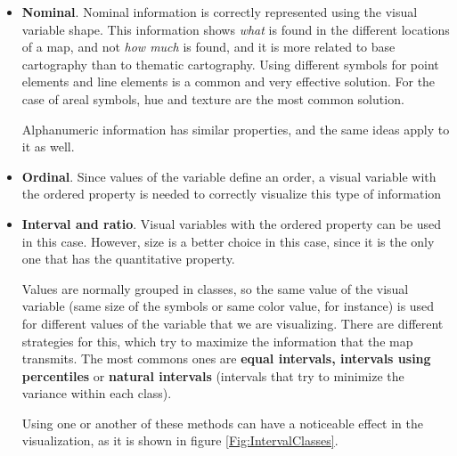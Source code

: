 \begin{itemize}
	
	\item \textbf{Nominal}. Nominal information is correctly represented using the visual variable shape. This information shows \emph{what} is found in the different locations of a map, and not \emph{how much} is found, and it is more related to base cartography than to thematic cartography. Using different symbols for point elements and line elements is a common and very effective solution. For the case of areal symbols, hue and texture are the most common solution.

	Alphanumeric information has similar properties, and the same ideas apply to it as well.
	
	\item \textbf{Ordinal}. Since values of the variable define an order, a visual variable with the ordered property is needed to correctly visualize this type of information
	
	\item \textbf{Interval and ratio}. Visual variables with the ordered property can be used in this case. However, size is a better choice in this case, since it is the only one that has the quantitative property.

	Values are normally grouped in classes, so the same value of the visual variable (same size of the symbols or same color value, for instance) is used for different values of the variable that we are visualizing. There are different strategies for this, which try to maximize the information that the map transmits. The most commons ones are \textbf{equal intervals, intervals using percentiles} or \textbf{natural intervals} (intervals that try to minimize the variance within each class).

	Using one or another of these methods can have a noticeable effect in the visualization, as it is shown in figure  \ref{Fig:IntervalClasses}.


\end{itemize}

